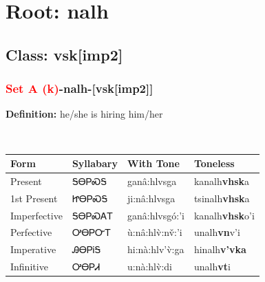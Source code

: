 \needspace{4in}
\section*{Root: nalh}
\nopagebreak
{}
\needspace{3in}
\subsection*{Class: vsk[imp2]}
\nopagebreak
\needspace{2in}
\subsubsection*{\textcolor{Red}{Set A (k)}{-}\textbf{nalh}{-}[vsk[imp2]]}
\nopagebreak
\textbf{Definition: } he/she is hiring him/her
\\[0.5em]
\begin{tabularx}{\textwidth}{l X X X}%
\toprule%
\textbf{Form}&\textbf{Syllabary}&\textbf{With Tone}&\textbf{Toneless}\\%
\midrule%
Present&ᎦᎾᏢᏍᎦ&ganâ:hlvsga&kanalh\textbf{vhsk}a\\%
1st Present&ᏥᎾᏢᏍᎦ&ji:nâ:hlvsga&tsinalh\textbf{vhsk}a\\%
Imperfective&ᎦᎾᏢᏍᎪᎢ&ganâ:hlvsgó:’i&kanalh\textbf{vhsk}o'i\\%
Perfective&ᎤᎾᏢᏅᎢ&ù:nâ:hlv̀:nv̌:’i&unalh\textbf{vn}v'i\\%
Imperative&ᎯᎾᏢᎥᎦ&hi:nà:hlv’v̀:ga&hinalh\textbf{v'vka}\\%
Infinitive&ᎤᎾᏢᏗ&u:nà:hlv̀:di&unalh\textbf{vt}i\\%
\bottomrule%
\end{tabularx}
\\[1em]
